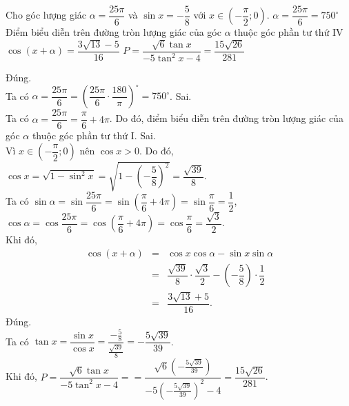 \begin{ex}%
	Cho góc lượng giác $\alpha = \dfrac{25\pi}{6}$ và $\sin x = -\dfrac{5}{8}$ với $x \in \left(-\dfrac{\pi}{2};0 \right)$.
\choiceTF
{\True $\alpha = \dfrac{25\pi}{6} = 750^\circ$}
{Điểm biểu diễn trên đường tròn lượng giác của góc $\alpha$ thuộc góc phần tư thứ IV}
{$\cos (x + \alpha)=\dfrac{3 \sqrt{13}-5}{16}$}
{\True $P= \dfrac{\sqrt{6}\tan x}{-5\tan^2 x-4}=\dfrac{15\sqrt{26}}{281}$}
\loigiai
{
\begin{itemchoice}
\itemch Đúng. \\
Ta có $\alpha = \dfrac{25\pi}{6} = \left( \dfrac{25\pi}{6} \cdot \dfrac{180}{\pi} \right)^\circ=750^\circ$.
\itemch Sai. \\
Ta có $\alpha = \dfrac{25\pi}{6} = \dfrac{\pi}{6} +4\pi$. Do đó, điểm biểu diễn trên đường tròn lượng giác của góc $\alpha$ thuộc góc phần tư thứ I.
\itemch Sai. \\
Vì $x \in \left(-\dfrac{\pi}{2};0 \right)$ nên $\cos x >0$. Do đó, $\cos x = \sqrt{1-\sin^2 x} =\sqrt{1-\left(-\dfrac{5}{8} \right)^2} =\dfrac{\sqrt{39}}{8}$. \\
Ta có $\sin \alpha = \sin \dfrac{25\pi}{6} = \sin \left( \dfrac{\pi}{6} +4\pi \right) = \sin \dfrac{\pi}{6} = \dfrac{1}{2}$,\\
$\cos \alpha = \cos \dfrac{25\pi}{6} = \cos \left( \dfrac{\pi}{6} +4\pi \right) = \cos \dfrac{\pi}{6} = \dfrac{\sqrt{3}}{2}$.\\
Khi đó, 
\begin{eqnarray*}
	\cos (x + \alpha) 
	& = & \cos x \cos \alpha - \sin x \sin \alpha \\
	& = & \dfrac{\sqrt{39}}{8} \cdot \dfrac{\sqrt{3}}{2} - \left( -\dfrac{5}{8} \right) \cdot \dfrac{1}{2} \\
	& = & \dfrac{3 \sqrt{13}+5}{16}.
\end{eqnarray*}
\itemch Đúng. \\
Ta có $\tan x = \dfrac{\sin x}{\cos x} = \dfrac{-\tfrac{5}{8}}{\tfrac{\sqrt{39}}{8}} = -\dfrac{5\sqrt{39}}{39}$.\\
Khi đó, $P= \dfrac{\sqrt{6}\tan x}{-5\tan^2 x-4}=
=\dfrac{\sqrt{6} \left( -\tfrac{5\sqrt{39}}{39}\right)}{-5 \left( -\tfrac{5\sqrt{39}}{39}\right)^2 -4} =
\dfrac{15\sqrt{26}}{281}$.
\end{itemchoice}
}
\end{ex}

